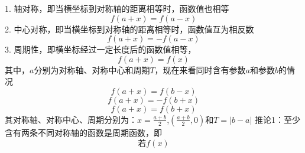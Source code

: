 1. 轴对称，即当横坐标到对称轴的距离相等时，函数值也相等
\begin{equation}
f\left( {a + x} \right) = f\left( {a - x} \right)
\end{equation}
2. 中心对称，即当横坐标到对称轴的距离相等时，函数值互为相反数
\begin{equation}
f\left( {a + x} \right) =  - f\left( {a - x} \right)
\end{equation}
3. 周期性，即横坐标经过一定长度后的函数值相等，
\begin{equation}
f\left( {a + x} \right) = f\left( x \right)
\end{equation}
其中，$a$分别为对称轴、对称中心和周期$T$，现在来看同时含有参数$a$和参数$b$的情况
\begin{equation}
f\left( {a + x} \right) = f\left( {b - x} \right)
\end{equation}
\begin{equation}
f\left( {a + x} \right) =  - f\left( {b + x} \right)
\end{equation}
\begin{equation}
f\left( {a + x} \right) = f\left( {b + x} \right)
\end{equation}
其对称轴、对称中心、周期分别为：$x = \frac{{a + b}}{2}$,$\left( {\frac{{a + b}}{2},0} \right)$和$T = \left| {b - a} \right|$
推论1：至少含有两条不同对称轴的函数是周期函数，即
\begin{equation}
若f(x)
\end{equation}